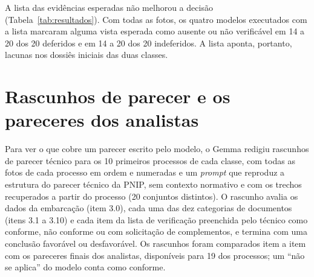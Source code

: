 A lista das evidências esperadas não melhorou a decisão (Tabela~\ref{tab:resultados}). Com todas as fotos, os quatro modelos executados com a lista marcaram alguma vista esperada como ausente ou não verificável em 14 a 20 dos 20 deferidos e em 14 a 20 dos 20 indeferidos. A lista aponta, portanto, lacunas nos dossiês iniciais das duas classes.

\section{Rascunhos de parecer e os pareceres dos analistas}
\label{sec:rascunhos}

Para ver o que cobre um parecer escrito pelo modelo, o Gemma redigiu rascunhos de parecer técnico para os 10 primeiros processos de cada classe, com todas as fotos de cada processo em ordem e numeradas e um \textit{prompt} que reproduz a estrutura do parecer técnico da PNIP, sem contexto normativo e com os trechos recuperados a partir do processo (20 conjuntos distintos). O rascunho avalia os dados da embarcação (item 3.0), cada uma das dez categorias de documentos (itens 3.1 a 3.10) e cada item da lista de verificação preenchida pelo técnico como conforme, não conforme ou com solicitação de complementos, e termina com uma conclusão favorável ou desfavorável. Os rascunhos foram comparados item a item com os pareceres finais dos analistas, disponíveis para 19 dos processos; um ``não se aplica'' do modelo conta como conforme.

